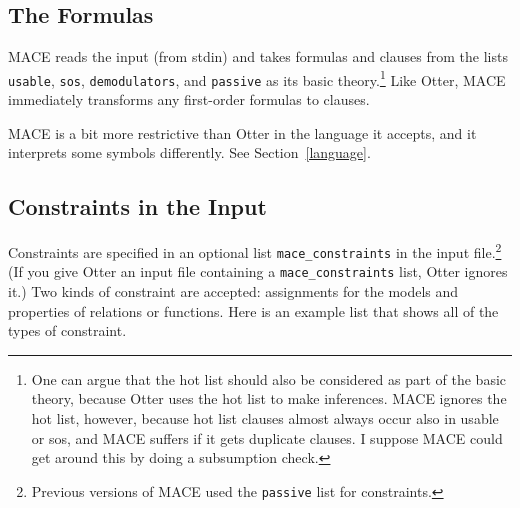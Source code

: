 \documentclass[11pt]{article}
\begin{document}
\subsection{The Formulas}

MACE reads the input (from stdin) and takes formulas and clauses from
the lists \texttt{usable}, \texttt{sos}, \texttt{demodulators}, and 
\texttt{passive} as its basic theory.\footnote
{
One can argue that the hot list should also be considered as
part of the basic theory, because Otter uses the hot list to
make inferences.  MACE ignores the hot list, however, because hot list
clauses almost always occur also in usable or sos, and MACE
suffers if it gets duplicate clauses.  I suppose MACE could
get around this by doing a subsumption check.
}
Like Otter, MACE immediately transforms any first-order formulas
to clauses.

MACE is a bit more restrictive than Otter in the language it accepts,
and it interprets some symbols differently.  See Section~\ref{language}.

\subsection{Constraints in the Input}

Constraints are specified in an optional
list \texttt{mace\_constraints} in the input file.\footnote
{
Previous versions of MACE used the \texttt{passive} list for constraints.
}
(If you give Otter an input file containing a \texttt{mace\_constraints} list,
Otter ignores it.)
Two kinds of constraint are accepted:
assignments for the models and
properties of relations or functions.
Here is an example list that shows all of the types of constraint.
\end{document}
